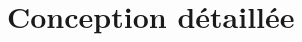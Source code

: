 \documentclass[a4paper,10pt]{report}
\begin{document}
\chapter{Conception détaillée}

%
%
%
%
%
%
%
%
%
%
\end{document}
